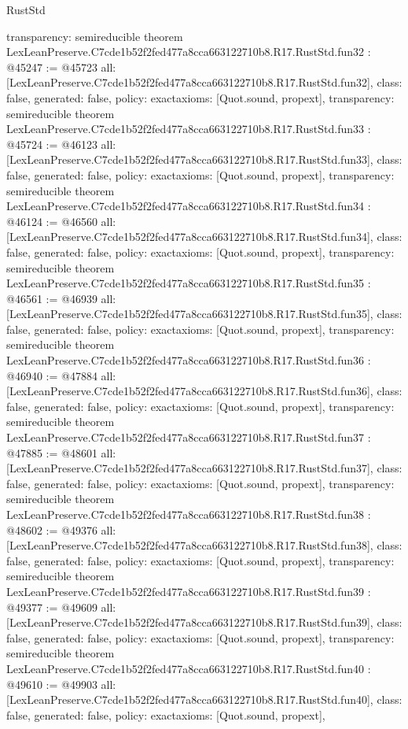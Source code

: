 \begin{lexlean}{RustStd}
\begin{coremodule}
{  transparency: semireducible
}
theorem LexLeanPreserve.C7cde1b52f2fed477a8cca663122710b8.R17.RustStd.fun32 : @45247 := @45723 {
  all: [LexLeanPreserve.C7cde1b52f2fed477a8cca663122710b8.R17.RustStd.fun32],
  class: false,
  generated: false,
  policy: exact{axioms: [Quot.sound, propext]},
  transparency: semireducible
}
theorem LexLeanPreserve.C7cde1b52f2fed477a8cca663122710b8.R17.RustStd.fun33 : @45724 := @46123 {
  all: [LexLeanPreserve.C7cde1b52f2fed477a8cca663122710b8.R17.RustStd.fun33],
  class: false,
  generated: false,
  policy: exact{axioms: [Quot.sound, propext]},
  transparency: semireducible
}
theorem LexLeanPreserve.C7cde1b52f2fed477a8cca663122710b8.R17.RustStd.fun34 : @46124 := @46560 {
  all: [LexLeanPreserve.C7cde1b52f2fed477a8cca663122710b8.R17.RustStd.fun34],
  class: false,
  generated: false,
  policy: exact{axioms: [Quot.sound, propext]},
  transparency: semireducible
}
theorem LexLeanPreserve.C7cde1b52f2fed477a8cca663122710b8.R17.RustStd.fun35 : @46561 := @46939 {
  all: [LexLeanPreserve.C7cde1b52f2fed477a8cca663122710b8.R17.RustStd.fun35],
  class: false,
  generated: false,
  policy: exact{axioms: [Quot.sound, propext]},
  transparency: semireducible
}
theorem LexLeanPreserve.C7cde1b52f2fed477a8cca663122710b8.R17.RustStd.fun36 : @46940 := @47884 {
  all: [LexLeanPreserve.C7cde1b52f2fed477a8cca663122710b8.R17.RustStd.fun36],
  class: false,
  generated: false,
  policy: exact{axioms: [Quot.sound, propext]},
  transparency: semireducible
}
theorem LexLeanPreserve.C7cde1b52f2fed477a8cca663122710b8.R17.RustStd.fun37 : @47885 := @48601 {
  all: [LexLeanPreserve.C7cde1b52f2fed477a8cca663122710b8.R17.RustStd.fun37],
  class: false,
  generated: false,
  policy: exact{axioms: [Quot.sound, propext]},
  transparency: semireducible
}
theorem LexLeanPreserve.C7cde1b52f2fed477a8cca663122710b8.R17.RustStd.fun38 : @48602 := @49376 {
  all: [LexLeanPreserve.C7cde1b52f2fed477a8cca663122710b8.R17.RustStd.fun38],
  class: false,
  generated: false,
  policy: exact{axioms: [Quot.sound, propext]},
  transparency: semireducible
}
theorem LexLeanPreserve.C7cde1b52f2fed477a8cca663122710b8.R17.RustStd.fun39 : @49377 := @49609 {
  all: [LexLeanPreserve.C7cde1b52f2fed477a8cca663122710b8.R17.RustStd.fun39],
  class: false,
  generated: false,
  policy: exact{axioms: [Quot.sound, propext]},
  transparency: semireducible
}
theorem LexLeanPreserve.C7cde1b52f2fed477a8cca663122710b8.R17.RustStd.fun40 : @49610 := @49903 {
  all: [LexLeanPreserve.C7cde1b52f2fed477a8cca663122710b8.R17.RustStd.fun40],
  class: false,
  generated: false,
  policy: exact{axioms: [Quot.sound, propext]},
}
\end{coremodule}
\end{lexlean}
